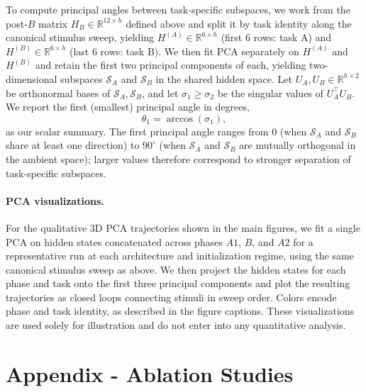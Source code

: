 \documentclass{article}
\theoremstyle{plain}
\theoremstyle{definition}
\theoremstyle{remark}
\begin{document}
To compute principal angles between task-specific subspaces, we work from the post-$B$ matrix $H_B \in \mathbb{R}^{12 \times h}$ defined above and split it by task identity along the canonical stimulus sweep, yielding $H^{(A)} \in \mathbb{R}^{6 \times h}$ (first 6 rows: task A) and $H^{(B)} \in \mathbb{R}^{6 \times h}$ (last 6 rows: task B). We then fit PCA separately on $H^{(A)}$ and $H^{(B)}$ and retain the first two principal components of each, yielding two-dimensional subspaces $\mathcal{S}_A$ and $\mathcal{S}_B$ in the shared hidden space. Let $U_A, U_B \in \mathbb{R}^{h \times 2}$ be orthonormal bases of $\mathcal{S}_A, \mathcal{S}_B$, and let $\sigma_1 \geq \sigma_2$ be the singular values of $U_A^\top U_B$. We report the first (smallest) principal angle in degrees,
\[
\theta_1 = \arccos(\sigma_1),
\]
as our scalar summary. The first principal angle ranges from $0$ (when $\mathcal{S}_A$ and $\mathcal{S}_B$ share at least one direction) to $90^\circ$ (when $\mathcal{S}_A$ and $\mathcal{S}_B$ are mutually orthogonal in the ambient space); larger values therefore correspond to stronger separation of task-specific subspaces.

\paragraph{PCA visualizations.}
For the qualitative 3D PCA trajectories shown in the main figures, we fit a single PCA on hidden states concatenated across phases $A1$, $B$, and $A2$ for a representative run at each architecture and initialization regime, using the same canonical stimulus sweep as above. We then project the hidden states for each phase and task onto the first three principal components and plot the resulting trajectories as closed loops connecting stimuli in sweep order. Colors encode phase and task identity, as described in the figure captions. These visualizations are used solely for illustration and do not enter into any quantitative analysis.


\section{Appendix - Ablation Studies}
\label{sec:appendix:ablation-studies}
\end{document}
